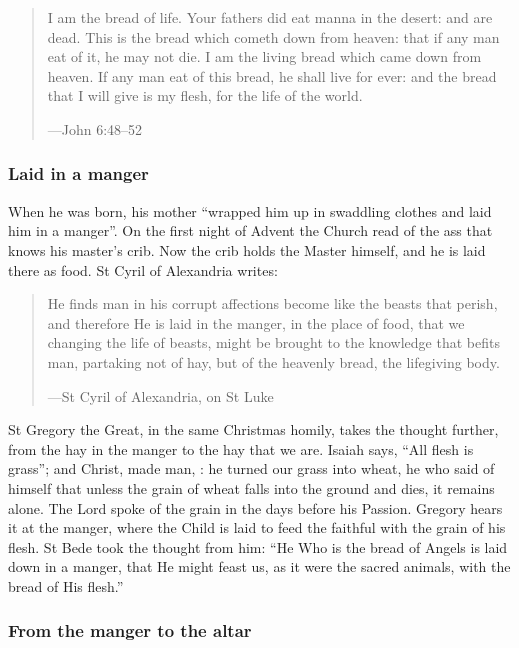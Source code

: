 \begin{quote}
I am the bread of life. Your fathers did eat manna in the desert: and are dead.
This is the bread which cometh down from heaven: that if any man eat of it, he
may not die. I am the living bread which came down from heaven. If any man eat
of this bread, he shall live for ever: and the bread that I will give is my
flesh, for the life of the world.\par
{\smallskip\noindent\small ---John 6:48--52\par}
\end{quote}

\subsubsection*{Laid in a manger}

When he was born, his mother ``wrapped him up in swaddling clothes and laid him
in a manger''. On the first night of Advent the Church read of the ass that
knows his master's crib. Now the crib holds the Master himself, and he is laid
there as food. St Cyril of Alexandria writes:

\begin{quote}
He finds man in his corrupt affections become like the beasts that perish, and
therefore He is laid in the manger, in the place of food, that we changing the
life of beasts, might be brought to the knowledge that befits man, partaking
not of hay, but of the heavenly bread, the lifegiving body.\par
{\smallskip\noindent\small ---St Cyril of Alexandria, on St Luke\par}
\end{quote}

St Gregory the Great, in the same Christmas homily, takes the thought further,
from the hay in the manger to the hay that we are. Isaiah says, ``All flesh
is grass''; and Christ, made man, : he
turned our grass into wheat, he who said of himself that unless the grain of
wheat falls into the ground and dies, it remains alone. The Lord spoke of the
grain in the days before his Passion. Gregory hears it at the manger, where the
Child is laid to feed the faithful with the grain of his flesh. St Bede took the
thought from him: ``He Who is the bread of Angels is laid down in a manger, that
He might feast us, as it were the sacred animals, with the bread of His
flesh.''

\subsubsection*{From the manger to the altar}

